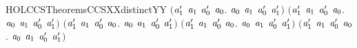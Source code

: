 \begin{SaveVerbatim}{HOLCCSTheoremsCCSXXdistinctYY}
   \ensuremath{(}\HOLSymConst{\HOLTokenForall{}}\ensuremath{\HOLBoundVar{a}\sb{\mathrm{1}}\sp{\prime{}}} \ensuremath{\HOLBoundVar{a}\sb{\mathrm{1}}} \ensuremath{\HOLBoundVar{a}\sb{\mathrm{0}}\sp{\prime{}}} \ensuremath{\HOLBoundVar{a}\sb{\mathrm{0}}}. \ensuremath{\HOLBoundVar{a}\sb{\mathrm{0}}} \HOLSymConst{\ensuremath{+}} \ensuremath{\HOLBoundVar{a}\sb{\mathrm{1}}} \HOLSymConst{\HOLTokenNotEqual{}}  \ensuremath{\HOLBoundVar{a}\sb{\mathrm{0}}\sp{\prime{}}} \ensuremath{\HOLBoundVar{a}\sb{\mathrm{1}}\sp{\prime{}}}\ensuremath{)} \HOLSymConst{\HOLTokenConj{}}
   \ensuremath{(}\HOLSymConst{\HOLTokenForall{}}\ensuremath{\HOLBoundVar{a}\sb{\mathrm{1}}\sp{\prime{}}} \ensuremath{\HOLBoundVar{a}\sb{\mathrm{1}}} \ensuremath{\HOLBoundVar{a}\sb{\mathrm{0}}\sp{\prime{}}} \ensuremath{\HOLBoundVar{a}\sb{\mathrm{0}}}. \ensuremath{\HOLBoundVar{a}\sb{\mathrm{0}}} \HOLSymConst{\ensuremath{+}} \ensuremath{\HOLBoundVar{a}\sb{\mathrm{1}}} \HOLSymConst{\HOLTokenNotEqual{}}  \ensuremath{\HOLBoundVar{a}\sb{\mathrm{0}}\sp{\prime{}}} \ensuremath{\HOLBoundVar{a}\sb{\mathrm{1}}\sp{\prime{}}}\ensuremath{)} \HOLSymConst{\HOLTokenConj{}}
   \ensuremath{(}\HOLSymConst{\HOLTokenForall{}}\ensuremath{\HOLBoundVar{a}\sb{\mathrm{1}}\sp{\prime{}}} \ensuremath{\HOLBoundVar{a}\sb{\mathrm{1}}} \ensuremath{\HOLBoundVar{a}\sb{\mathrm{0}}\sp{\prime{}}} \ensuremath{\HOLBoundVar{a}\sb{\mathrm{0}}}. \ensuremath{\HOLBoundVar{a}\sb{\mathrm{0}}} \HOLSymConst{\ensuremath{\mid}} \ensuremath{\HOLBoundVar{a}\sb{\mathrm{1}}} \HOLSymConst{\HOLTokenNotEqual{}}  \ensuremath{\HOLBoundVar{a}\sb{\mathrm{0}}\sp{\prime{}}} \ensuremath{\HOLBoundVar{a}\sb{\mathrm{1}}\sp{\prime{}}}\ensuremath{)} \HOLSymConst{\HOLTokenConj{}}
   \ensuremath{(}\HOLSymConst{\HOLTokenForall{}}\ensuremath{\HOLBoundVar{a}\sb{\mathrm{1}}\sp{\prime{}}} \ensuremath{\HOLBoundVar{a}\sb{\mathrm{1}}} \ensuremath{\HOLBoundVar{a}\sb{\mathrm{0}}\sp{\prime{}}} \ensuremath{\HOLBoundVar{a}\sb{\mathrm{0}}}. \ensuremath{\HOLBoundVar{a}\sb{\mathrm{0}}} \HOLSymConst{\ensuremath{\mid}} \ensuremath{\HOLBoundVar{a}\sb{\mathrm{1}}} \HOLSymConst{\HOLTokenNotEqual{}}  \ensuremath{\HOLBoundVar{a}\sb{\mathrm{0}}\sp{\prime{}}} \ensuremath{\HOLBoundVar{a}\sb{\mathrm{1}}\sp{\prime{}}}\ensuremath{)} \HOLSymConst{\HOLTokenConj{}}
   \ensuremath{(}\HOLSymConst{\HOLTokenForall{}}\ensuremath{\HOLBoundVar{a}\sb{\mathrm{1}}\sp{\prime{}}} \ensuremath{\HOLBoundVar{a}\sb{\mathrm{1}}} \ensuremath{\HOLBoundVar{a}\sb{\mathrm{0}}\sp{\prime{}}} \ensuremath{\HOLBoundVar{a}\sb{\mathrm{0}}}. \ensuremath{\HOLBoundVar{a}\sb{\mathrm{0}}} \HOLSymConst{\ensuremath{\mid}} \ensuremath{\HOLBoundVar{a}\sb{\mathrm{1}}} \HOLSymConst{\HOLTokenNotEqual{}}  \ensuremath{\HOLBoundVar{a}\sb{\mathrm{0}}\sp{\prime{}}} \ensuremath{\HOLBoundVar{a}\sb{\mathrm{1}}\sp{\prime{}}}\ensuremath{)} \HOLSymConst{\HOLTokenConj{}}

\end{SaveVerbatim}
